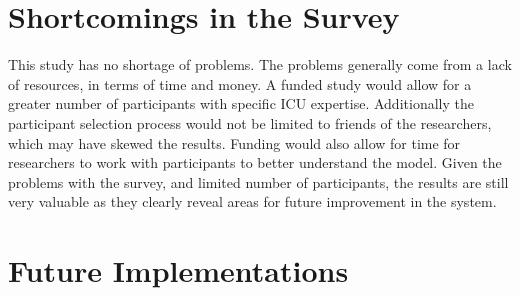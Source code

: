 \documentclass[12pt,a4paper,]{report}
\begin{document}
\section{Shortcomings in the Survey}\label{shortcomings-in-the-survey}

This study has no shortage of problems. The problems generally come from
a lack of resources, in terms of time and money. A funded study would
allow for a greater number of participants with specific ICU expertise.
Additionally the participant selection process would not be limited to
friends of the researchers, which may have skewed the results. Funding
would also allow for time for researchers to work with participants to
better understand the model. Given the problems with the survey, and
limited number of participants, the results are still very valuable as
they clearly reveal areas for future improvement in the system.

\section{Future Implementations}\label{future-implementations}
\end{document}
